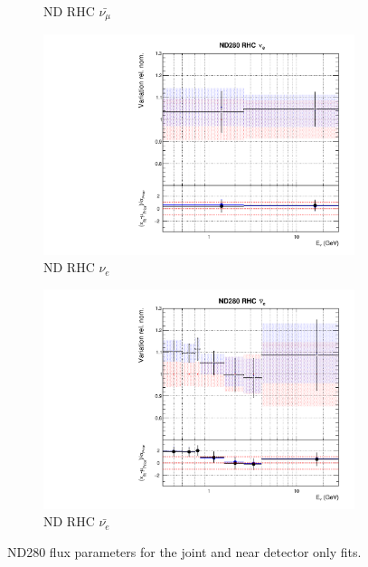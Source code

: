 \begin{figure}[!htbp]
\begin{subfigure}{0.45\textwidth}
  \caption{ND RHC $\bar{\nu_{\mu}}$}
\end{subfigure}
\begin{subfigure}{0.45\textwidth}
  \centering
  \includegraphics[width=0.75\linewidth]{figs/jointflux6}
  \caption{ND RHC $\nu_{e}$}
\end{subfigure}
\begin{subfigure}{0.45\textwidth}
  \centering
  \includegraphics[width=0.75\linewidth]{figs/jointflux7}
  \caption{ND RHC $\bar{\nu_e}$}
\end{subfigure}
\caption{ND280 flux parameters for the joint and near detector only fits.}
\label{fig:jointfluxNDapp}
\end{figure}


